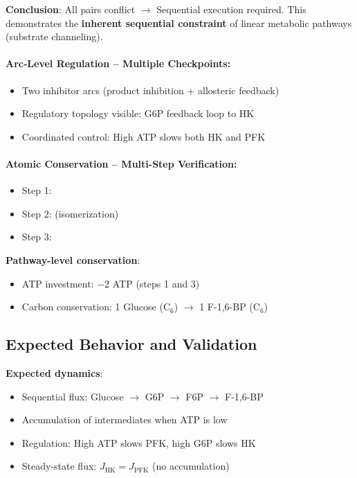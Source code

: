 \textbf{Conclusion}: All pairs conflict $\to$ Sequential execution required. This demonstrates the \textbf{inherent sequential constraint} of linear metabolic pathways (substrate channeling).

\paragraph{Arc-Level Regulation -- Multiple Checkpoints:}

\begin{itemize}
    \item Two inhibitor arcs (product inhibition + allosteric feedback)
    \item Regulatory topology visible: G6P feedback loop to HK
    \item Coordinated control: High ATP slows both HK and PFK
\end{itemize}

\paragraph{Atomic Conservation -- Multi-Step Verification:}

\begin{itemize}
    \item Step 1:  \checkmark
    \item Step 2:  \checkmark (isomerization)
    \item Step 3:  \checkmark
\end{itemize}

\textbf{Pathway-level conservation}:
\begin{itemize}
    \item ATP investment: $-2$ ATP (steps 1 and 3)
    \item Carbon conservation: 1 Glucose (C$_6$) $\to$ 1 F-1,6-BP (C$_6$) \checkmark
\end{itemize}

\subsection{Expected Behavior and Validation}
\label{subsec:gly-validation}

\textbf{Expected dynamics}:

\begin{itemize}
    \item Sequential flux: Glucose $\to$ G6P $\to$ F6P $\to$ F-1,6-BP
    \item Accumulation of intermediates when ATP is low
    \item Regulation: High ATP slows PFK, high G6P slows HK
    \item Steady-state flux: $J_{\text{HK}} = J_{\text{PFK}}$ (no accumulation)
\end{itemize}

